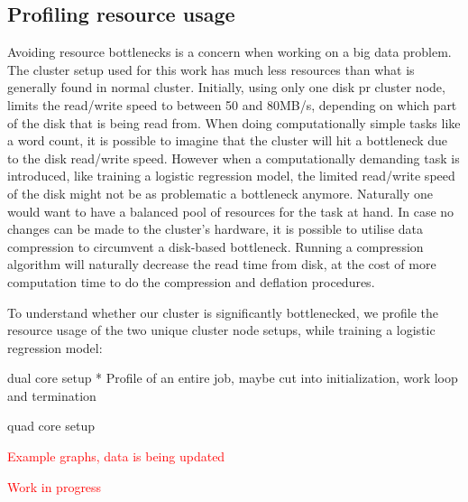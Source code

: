 \subsection{Profiling resource usage}\label{sec:profile}

Avoiding resource bottlenecks is a concern when working on a big data problem. 
The cluster setup used for this work has much less resources than what is generally found in normal cluster. 
Initially, using only one disk pr cluster node, limits the read/write speed to between 50 and 80MB/s, depending on which part of the disk that is being read from. 
When doing computationally simple tasks like a word count, it is possible to imagine that the cluster will hit a bottleneck due to the disk read/write speed. 
However when a computationally demanding task is introduced, like training a logistic regression model, the limited read/write speed of the disk might not be as problematic a bottleneck anymore. %
Naturally one would want to have a balanced pool of resources for the task at hand. 
In case no changes can be made to the cluster's hardware, it is possible to utilise data compression to circumvent a disk-based bottleneck. 
Running a compression algorithm will naturally decrease the read time from disk, at the cost of more computation time to do the compression and deflation procedures.

To understand whether our cluster is significantly bottlenecked, we profile the resource usage of the two unique cluster node setups, while training a logistic regression model:

dual core setup
* Profile of an entire job, maybe cut into initialization, work loop and termination

quad core setup

\textcolor{red}{Example graphs, data is being updated}


\FloatBarrier


\textcolor{red}{Work in progress}